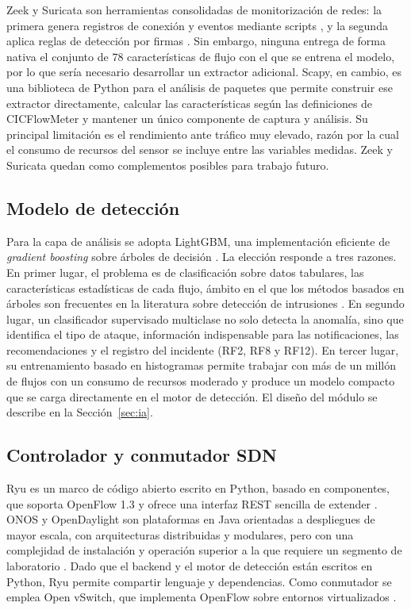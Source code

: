 Zeek y Suricata son herramientas consolidadas de monitorización de redes: la primera genera registros de conexión y eventos mediante scripts \parencite{paxson1999,zeekdocs}, y la segunda aplica reglas de detección por firmas \parencite{suricata}. Sin embargo, ninguna entrega de forma nativa el conjunto de 78 características de flujo con el que se entrena el modelo, por lo que sería necesario desarrollar un extractor adicional. Scapy, en cambio, es una biblioteca de Python para el análisis de paquetes \parencite{scapydocs} que permite construir ese extractor directamente, calcular las características según las definiciones de CICFlowMeter \parencite{lashkari2017} y mantener un único componente de captura y análisis. Su principal limitación es el rendimiento ante tráfico muy elevado, razón por la cual el consumo de recursos del sensor se incluye entre las variables medidas. Zeek y Suricata quedan como complementos posibles para trabajo futuro.

\subsection{Modelo de detección}

Para la capa de análisis se adopta LightGBM, una implementación eficiente de \emph{gradient boosting} sobre árboles de decisión \parencite{lightgbm2017}. La elección responde a tres razones. En primer lugar, el problema es de clasificación sobre datos tabulares, las características estadísticas de cada flujo, ámbito en el que los métodos basados en árboles son frecuentes en la literatura sobre detección de intrusiones \parencite{buczak2016,khraisat2019}. En segundo lugar, un clasificador supervisado multiclase no solo detecta la anomalía, sino que identifica el tipo de ataque, información indispensable para las notificaciones, las recomendaciones y el registro del incidente (RF2, RF8 y RF12). En tercer lugar, su entrenamiento basado en histogramas permite trabajar con más de un millón de flujos con un consumo de recursos moderado y produce un modelo compacto que se carga directamente en el motor de detección. El diseño del módulo se describe en la Sección~\ref{sec:ia}.

\subsection{Controlador y conmutador SDN}

Ryu es un marco de código abierto escrito en Python, basado en componentes, que soporta OpenFlow 1.3 y ofrece una interfaz REST sencilla de extender \parencite{kubo2014ryu,ryudocs}. ONOS y OpenDaylight son plataformas en Java orientadas a despliegues de mayor escala, con arquitecturas distribuidas y modulares, pero con una complejidad de instalación y operación superior a la que requiere un segmento de laboratorio \parencite{berde2014onos,khattak2014odl,bondkovskii2016}. Dado que el backend y el motor de detección están escritos en Python, Ryu permite compartir lenguaje y dependencias. Como conmutador se emplea Open vSwitch, que implementa OpenFlow sobre entornos virtualizados \parencite{openvswitch2015,mckeown2008openflow}.


